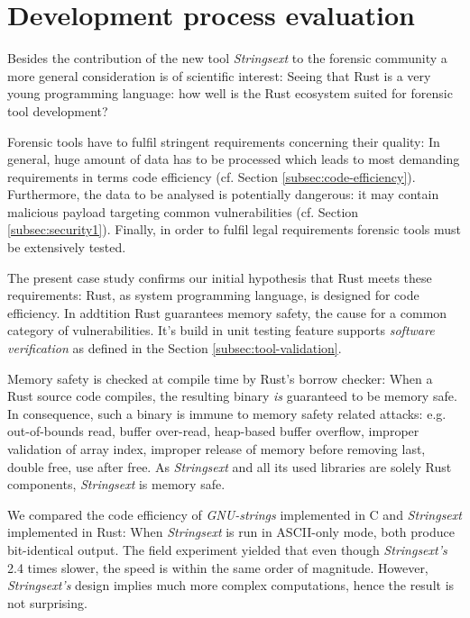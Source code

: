 \documentclass[final,5p,times,twocolumn]{elsarticle}
\begin{document}
\section{Development process evaluation}\label{_development_process_evaluation}

Besides the contribution of the new tool \emph{Strings­ext} to the
forensic community a more general consideration is of scientific
interest: Seeing that Rust is a very young programming language: how
well is the Rust ecosystem suited for forensic tool development?

Forensic tools have to fulfil stringent requirements concerning their quality:
In general, huge amount of data has to be processed which leads to most
demanding requirements in terms code efficiency (cf. Section
\ref{subsec:code-efficiency}).  Furthermore, the data to be analysed is
potentially dangerous: it may contain malicious payload targeting common
vulnerabilities (cf. Section \ref{subsec:security1}).  Finally, in order to
fulfil legal requirements forensic tools must be extensively tested.

The present case study confirms our initial hypothesis that Rust meets these
requirements: Rust, as system programming language, is designed for code
efficiency. In addtition Rust guarantees memory safety, the cause for a
common category of vulnerabilities. It's build in unit testing feature supports
\emph{software verification} as defined in the Section
\ref{subsec:tool-validation}.

Memory safety is checked at compile time by Rust's borrow checker:
When a Rust source code compiles, the resulting binary \emph{is}
guaranteed to be memory safe. In consequence, such a binary is immune to
memory safety related attacks: e.g. out-of-bounds read, buffer
over-read, heap-based buffer overflow, improper validation of array
index, improper release of memory before removing last, double free, use
after free. As \emph{Strings­ext} and all its used libraries are solely
Rust components, \emph{Strings­ext} is memory safe.

We compared the code efficiency of \emph{GNU-strings} implemented in C and
\emph{Strings­ext} implemented in Rust: When \emph{Strings­ext} is run in
ASCII-only mode, both produce bit-identical output. The field experiment yielded
that even though \emph{Stringsext's} 2.4 times slower, the speed is within the
same order of magnitude. However, \emph{Stringsext's} design implies much more
complex computations, hence the result is not surprising.
\end{document}
